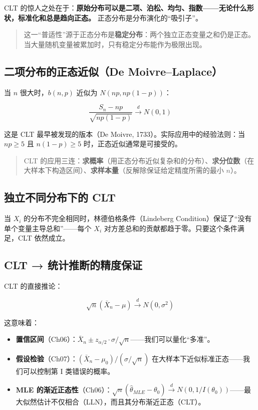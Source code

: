 \documentclass[
]{book}
\providecommand{\tightlist}{%
  \setlength{\itemsep}{0pt}\setlength{\parskip}{0pt}}
\begin{document}
CLT 的惊人之处在于：\textbf{原始分布可以是二项、泊松、均匀、指数------无论什么形状，标准化和总是趋向正态。} 正态分布是分布演化的``吸引子''。

\begin{quote}
这一``普适性''源于正态分布是\textbf{稳定分布}：两个独立正态变量之和仍是正态。当大量随机变量被累加时，只有稳定分布能作为极限出现。
\end{quote}

\subsection{二项分布的正态近似（De Moivre--Laplace）}\label{ux4e8cux9879ux5206ux5e03ux7684ux6b63ux6001ux8fd1ux4f3cde-moivrelaplace}

当 \(n\) 很大时，\(b(n,p)\) 近似为 \(N(np, np(1-p))\)：

\[\frac{S_n - np}{\sqrt{np(1-p)}} \xrightarrow{d} N(0,1)\]

这是 CLT 最早被发现的版本（De Moivre, 1733）。实际应用中的经验法则：当 \(np \geq 5\) 且 \(n(1-p) \geq 5\) 时，正态近似通常是可接受的。

\begin{quote}
CLT 的应用三连：\textbf{求概率}（用正态分布近似复杂和的分布）、\textbf{求分位数}（在大样本下构造区间）、\textbf{求样本量}（反解除保证给定精度所需的最小 \(n\)）。
\end{quote}

\subsection{独立不同分布下的 CLT}\label{ux72ecux7acbux4e0dux540cux5206ux5e03ux4e0bux7684-clt}

当 \(X_i\) 的分布不完全相同时，林德伯格条件（Lindeberg Condition）保证了``没有单个变量主导总和''------每个 \(X_i\) 对方差总和的贡献都趋于零。只要这个条件满足，CLT 依然成立。

\subsection{CLT → 统计推断的精度保证}\label{clt-ux7edfux8ba1ux63a8ux65adux7684ux7cbeux5ea6ux4fddux8bc1}

CLT 的直接推论：

\[\sqrt{n}(\bar{X}_n - \mu) \xrightarrow{d} N(0, \sigma^2)\]

这意味着：

\begin{itemize}
\tightlist
\item
  \textbf{置信区间}（Ch06）：\(\bar{X}_n \pm z_{\alpha/2} \cdot \sigma/\sqrt{n}\)------我们可以量化``多准''。
\item
  \textbf{假设检验}（Ch07）：\((\bar{X}_n - \mu_0)/(\sigma/\sqrt{n})\) 在大样本下近似标准正态------我们可以控制第 I 类错误的概率。
\item
  \textbf{MLE 的渐近正态性}（Ch06）：\(\sqrt{n}(\hat{\theta}_{MLE} - \theta_0) \xrightarrow{d} N(0, 1/I(\theta_0))\)------最大似然估计不仅相合（LLN），而且其分布渐近正态（CLT）。
\end{itemize}
\end{document}

